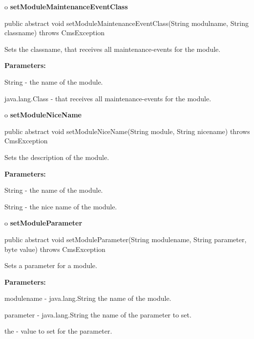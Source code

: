 o {\bf setModuleMaintenanceEventClass} 

\begin{PRE}
 public abstract void setModuleMaintenanceEventClass(String modulname,
                                                     String classname) throws CmsException
\end{PRE}

\begin{description}
\htmlDD Sets the classname, that receives all maintenance-events for the
module. 

\begin{description}
\item {\bf Parameters:}  

String - the name of the module.  

java.lang.Class - that receives all maintenance-events for the module.  
\end{description}

\end{description}

o {\bf setModuleNiceName} 

\begin{PRE}
 public abstract void setModuleNiceName(String module,
                                        String nicename) throws CmsException
\end{PRE}

\begin{description}
\htmlDD Sets the description of the module. 

\begin{description}
\item {\bf Parameters:}  

String - the name of the module.  

String - the nice name of the module.  
\end{description}

\end{description}

o {\bf setModuleParameter} 

\begin{PRE}
 public abstract void setModuleParameter(String modulename,
                                         String parameter,
                                         byte value) throws CmsException
\end{PRE}

\begin{description}
\htmlDD Sets a parameter for a module. 

\begin{description}
\item {\bf Parameters:}  

modulename - java.lang.String the name of the module.  

parameter - java.lang.String the name of the parameter to set.  

the - value to set for the parameter.  
\end{description}

\end{description}

